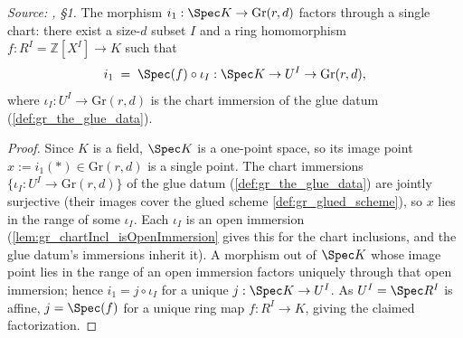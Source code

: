 \begin{lemma}\leanok
  \label{lem:gr_existence_chart_factorization}
  \textit{Source: \cite{nitsure-hilbert-quot}, \S 1.}
  The morphism \(i_1 : \Spec K \to \mathrm{Gr}(r,d)\) factors through a single
  chart: there exist a size-\(d\) subset \(I\) and a ring homomorphism \(f : R^I =
  \mathbb{Z}[X^I] \to K\) such that
  \[
    i_1 \;=\; \Spec(f) \circ \iota_I : \Spec K \to U^I \to \mathrm{Gr}(r,d),
  \]
  where \(\iota_I : U^I \to \mathrm{Gr}(r,d)\) is the chart immersion of the glue
  datum (\cref{def:gr_the_glue_data}).
\end{lemma}
\begin{proof}
  \leanok
  Since \(K\) is a field, \(\Spec K\) is a one-point space, so its image point \(x
  := i_1(\ast) \in \mathrm{Gr}(r,d)\) is a single point. The chart immersions
  \(\{\iota_I : U^I \to \mathrm{Gr}(r,d)\}\) of the glue datum
  (\cref{def:gr_the_glue_data}) are jointly surjective (their images cover the
  glued scheme \cref{def:gr_glued_scheme}), so \(x\) lies in the range of some
  \(\iota_I\). Each \(\iota_I\) is an open immersion
  (\cref{lem:gr_chartIncl_isOpenImmersion} gives this for the chart inclusions, and
  the glue datum's immersions inherit it). A morphism out of \(\Spec K\) whose
  image point lies in the range of an open immersion factors uniquely through that
  open immersion; hence \(i_1 = j \circ \iota_I\) for a unique \(j : \Spec K \to
  U^I\). As \(U^I = \Spec R^I\) is affine, \(j = \Spec(f)\) for a unique ring map
  \(f : R^I \to K\), giving the claimed factorization.
\end{proof}

